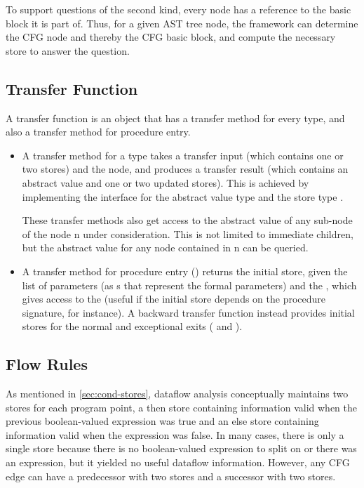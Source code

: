 To support questions of the second kind, every node has a reference to
the basic block it is part of. Thus, for a given AST tree node, the
framework can determine the CFG node and thereby the CFG basic block,
and compute the necessary store to answer the question.


\subsection{Transfer Function}
\label{sec:transfer-fnc}

A transfer function is an object that has a transfer method for
every  type, and also a transfer method for procedure entry.

\begin{itemize}
\item A transfer method for a  type takes a transfer input
  (which contains one or two stores) and the node, and produces a transfer
  result (which contains an abstract value and one or two updated stores).
  This is achieved by implementing the
   interface
  for the abstract value type  and the store type .

  These transfer methods also get access to the abstract value of any
  sub-node of the node \code n under consideration.  This is not limited
  to immediate children, but the abstract value for any node contained
  in \code n can be queried.

\item A transfer method for procedure entry ()
  returns the initial store, given the
  list of parameters (as s that represent the formal
  parameters) and the
  , which gives access to the  (useful
  if the initial store depends on the procedure
  signature, for instance).  A backward transfer function instead provides
  initial stores for the normal and exceptional exits
  ( and
  ).

\end{itemize}


\subsection{Flow Rules}
\label{sec:flow-rules}

As mentioned in \autoref{sec:cond-stores}, dataflow analysis
conceptually maintains two stores for each program point, a then store
containing information valid when the previous boolean-valued
expression was true and an else store containing information valid
when the expression was false.  In many cases, there is only a single
store because there is no boolean-valued expression to split on or
there was an expression, but it yielded no useful dataflow
information.  However, any CFG edge can have a predecessor
with two stores and a successor with two stores.

